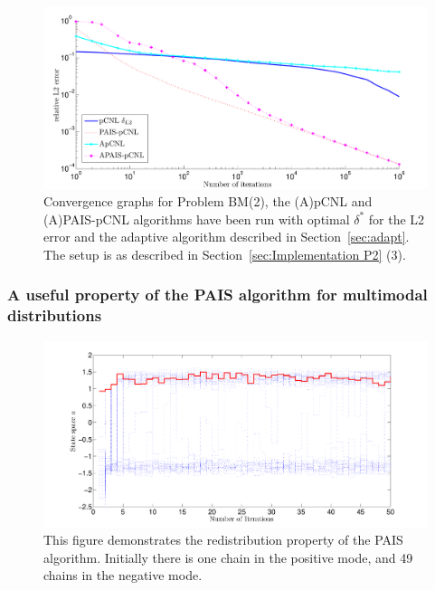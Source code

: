 \documentclass[final]{siamltex}
\begin{document}
\begin{figure}
\begin{center}
\includegraphics[width=\textwidth]{"figures/BM2_AL2"}
\caption{Convergence graphs for Problem BM(2), the (A)pCNL and (A)PAIS-pCNL algorithms have been run with optimal $\delta^*$ for the L2 error and the adaptive algorithm described in Section~\ref{sec:adapt}. The setup is as described in Section~\ref{sec:Implementation P2} (3).}
\label{fig:BM2_AL2}
\end{center}
\end{figure}

\subsubsection{A useful property of the PAIS algorithm for multimodal distributions}

\begin{figure}
\begin{center}
\includegraphics[width=\textwidth]{"figures/BM2_suction"}
\caption{This figure demonstrates the redistribution property of the PAIS algorithm. Initially there is one chain in the positive mode, and 49 chains in the negative mode.}
\label{fig:BM2_suction}
\end{center}
\end{figure}
\end{document}
